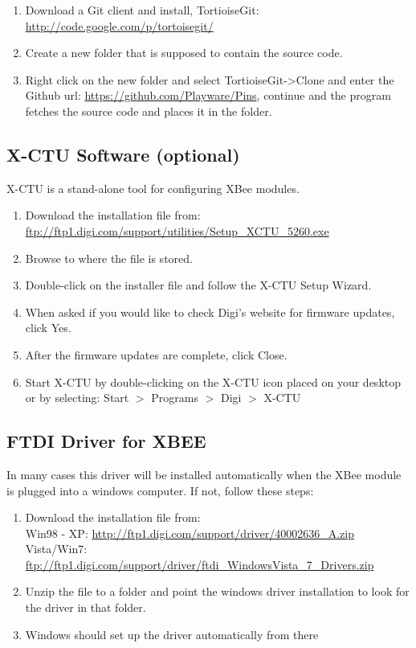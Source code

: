 \documentclass[a4paper, twoside, final]{book}%
\begin{document}
\begin{enumerate}
  \item Download a Git client and install, TortioiseGit:\\
    \url{http://code.google.com/p/tortoisegit/}
  \item Create a new folder that is supposed to contain the source code.
  \item Right click on the new folder and select TortioiseGit->Clone
    and enter the Github url: \url{https://github.com/Playware/Pins},
    continue and the program fetches the source code and places it in the folder.
\end{enumerate}

\subsection*{X-CTU Software (optional)}
X-CTU is a stand-alone tool for configuring XBee modules.
\begin{enumerate}
	\item Download the installation file from:\\ 
	\url{ftp://ftp1.digi.com/support/utilities/Setup_XCTU_5260.exe}
	\item Browse to where the file is stored.
	\item Double-click on the installer file and follow the X-CTU Setup Wizard.
	\item When asked if you would like to check Digi's website for firmware updates, click Yes. 
	\item After the firmware updates are complete, click Close.
	\item Start X-CTU by double-clicking on the X-CTU icon placed on your desktop or by selecting: 
Start $>$ Programs $>$ Digi $>$ X-CTU 
\end{enumerate}

\subsection*{\bf FTDI Driver for XBEE}
In many cases this driver will be installed automatically when the XBee module is plugged into a windows computer. If not, follow these steps:
\begin{enumerate}
	\item Download the installation file from: \\ 	   
	Win98 - XP: \url{http://ftp1.digi.com/support/driver/40002636_A.zip}
	Vista/Win7: \url{ftp://ftp1.digi.com/support/driver/ftdi_WindowsVista_7_Drivers.zip}
	\item Unzip the file to a folder and point the windows driver installation to look for the driver in that folder.
	\item Windows should set up the driver automatically from there	
\end{enumerate}
\end{document}
